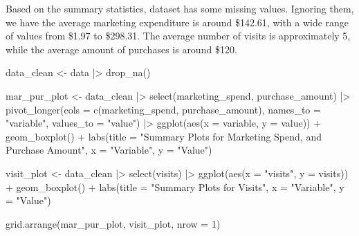 \documentclass[
  letterpaper,
  DIV=11,
  numbers=noendperiod]{scrartcl}
\newenvironment{Shaded}{\begin{snugshade}}{\end{snugshade}}
\newcommand{\AttributeTok}[1]{\textcolor[rgb]{0.40,0.45,0.13}{#1}}
\newcommand{\DecValTok}[1]{\textcolor[rgb]{0.68,0.00,0.00}{#1}}
\newcommand{\FunctionTok}[1]{\textcolor[rgb]{0.28,0.35,0.67}{#1}}
\newcommand{\NormalTok}[1]{\textcolor[rgb]{0.00,0.23,0.31}{#1}}
\newcommand{\OtherTok}[1]{\textcolor[rgb]{0.00,0.23,0.31}{#1}}
\newcommand{\SpecialCharTok}[1]{\textcolor[rgb]{0.37,0.37,0.37}{#1}}
\newcommand{\StringTok}[1]{\textcolor[rgb]{0.13,0.47,0.30}{#1}}
\begin{document}
Based on the summary statistics, dataset has some missing values.
Ignoring them, we have the average marketing expenditure is around
\$142.61, with a wide range of values from \$1.97 to \$298.31. The
average number of visits is approximately 5, while the average amount of
purchases is around \$120.

\begin{Shaded}
\begin{Highlighting}[]
\NormalTok{data\_clean }\OtherTok{\textless{}{-}}\NormalTok{ data }\SpecialCharTok{|\textgreater{}} \FunctionTok{drop\_na}\NormalTok{()}
\end{Highlighting}
\end{Shaded}

\begin{Shaded}
\begin{Highlighting}[]
\NormalTok{mar\_pur\_plot }\OtherTok{\textless{}{-}}\NormalTok{ data\_clean }\SpecialCharTok{|\textgreater{}} \FunctionTok{select}\NormalTok{(marketing\_spend, purchase\_amount) }\SpecialCharTok{|\textgreater{}} 
  \FunctionTok{pivot\_longer}\NormalTok{(}\AttributeTok{cols =} \FunctionTok{c}\NormalTok{(marketing\_spend, purchase\_amount), }
               \AttributeTok{names\_to =} \StringTok{"variable"}\NormalTok{, }
               \AttributeTok{values\_to =} \StringTok{"value"}\NormalTok{) }\SpecialCharTok{|\textgreater{}} 
  \FunctionTok{ggplot}\NormalTok{(}\FunctionTok{aes}\NormalTok{(}\AttributeTok{x =}\NormalTok{ variable, }\AttributeTok{y =}\NormalTok{ value)) }\SpecialCharTok{+}
  \FunctionTok{geom\_boxplot}\NormalTok{() }\SpecialCharTok{+}
  \FunctionTok{labs}\NormalTok{(}\AttributeTok{title =} \StringTok{"Summary Plots for Marketing Spend, and Purchase Amount"}\NormalTok{,}
       \AttributeTok{x =} \StringTok{"Variable"}\NormalTok{,}
       \AttributeTok{y =} \StringTok{"Value"}\NormalTok{)}

\NormalTok{visit\_plot }\OtherTok{\textless{}{-}}\NormalTok{ data\_clean }\SpecialCharTok{|\textgreater{}} \FunctionTok{select}\NormalTok{(visits) }\SpecialCharTok{|\textgreater{}}  
  \FunctionTok{ggplot}\NormalTok{(}\FunctionTok{aes}\NormalTok{(}\AttributeTok{x =} \StringTok{"visits"}\NormalTok{, }\AttributeTok{y =}\NormalTok{ visits)) }\SpecialCharTok{+}
  \FunctionTok{geom\_boxplot}\NormalTok{() }\SpecialCharTok{+}
  \FunctionTok{labs}\NormalTok{(}\AttributeTok{title =} \StringTok{"Summary Plots for Visits"}\NormalTok{,}
       \AttributeTok{x =} \StringTok{"Variable"}\NormalTok{,}
       \AttributeTok{y =} \StringTok{"Value"}\NormalTok{)}

\FunctionTok{grid.arrange}\NormalTok{(mar\_pur\_plot, visit\_plot, }\AttributeTok{nrow =} \DecValTok{1}\NormalTok{)}
\end{Highlighting}
\end{Shaded}
\end{document}
